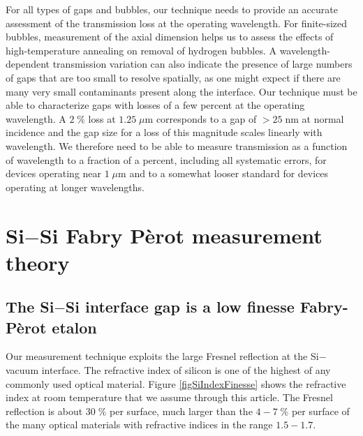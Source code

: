 \documentclass[osajnl,preprint,showpacs,superscriptaddress,12pt]{revtex4-1} %
\begin{document}
For all types of gaps and bubbles, our technique needs to provide an accurate assessment of the transmission loss at the operating wavelength.  For finite-sized bubbles, measurement of the axial dimension helps us to assess the effects of high-temperature annealing \cite{Horn2009, Masteika2014} on removal of hydrogen bubbles.  A wavelength-dependent transmission variation can also indicate the presence of large numbers of gaps that are too small to resolve spatially, as one might expect if there are many very small contaminants present along the interface.  Our technique must be able to characterize gaps with losses of a few percent at the operating wavelength.  A $2\;\%$ loss at $1.25\;\mu$m corresponds to a gap of $>25\;$nm at normal incidence and the gap size for a loss of this magnitude scales linearly with wavelength.  We therefore need to be able to measure transmission as a function of wavelength to a fraction of a percent, including all systematic errors, for devices operating near $1\;\mu$m and to a somewhat looser standard for devices operating at longer wavelengths.


\section{Si$-$Si Fabry P\`{e}rot measurement theory}
\label{secTheory}

\subsection{The Si$-$Si interface gap is a low finesse Fabry-P\`{e}rot etalon}

Our measurement technique exploits the large Fresnel reflection \cite{2001opt4.book.....H} at the Si$-$vacuum interface.  The refractive index of silicon is one of the highest of any commonly used optical material.  Figure \ref{figSiIndexFinesse} shows the refractive index at room temperature \cite{2006SPIE.6273E..77F} that we assume through this article.  The Fresnel reflection is about $30\;\%$ per surface, much larger than the $4-7\;\%$ per surface of the many optical materials with refractive indices in the range $1.5-1.7$.
\end{document}
